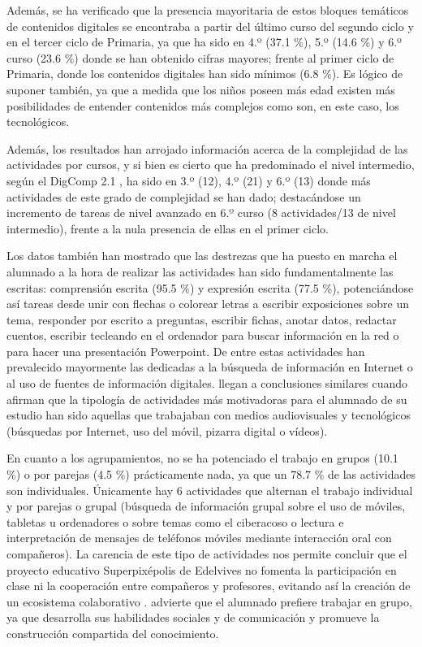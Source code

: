 \documentclass[spanish]{textolivre}
\begin{document}
Además, se ha verificado que la presencia mayoritaria de estos bloques temáticos de contenidos digitales se encontraba a partir del último curso del segundo ciclo y en el tercer ciclo de Primaria, ya que ha sido en 4.º (37.1 \%), 5.º (14.6 \%) y 6.º curso (23.6 \%) donde se han obtenido cifras mayores; frente al primer ciclo de Primaria, donde los contenidos digitales han sido mínimos (6.8 \%). Es lógico de suponer también, ya que a medida que los niños poseen más edad existen más posibilidades de entender contenidos más complejos como son, en este caso, los tecnológicos. 

Además, los resultados han arrojado información acerca de la complejidad de las actividades por cursos, y si bien es cierto que ha predominado el nivel intermedio, según el DigComp 2.1 \cite{carretero_2018}, ha sido en 3.º (12), 4.º (21) y 6.º (13) donde más actividades de este grado de complejidad se han dado; destacándose un incremento de tareas de nivel avanzado en 6.º curso (8 actividades/13 de nivel intermedio), frente a la nula presencia de ellas en el primer ciclo. 

Los datos también han mostrado que las destrezas que ha puesto en marcha el alumnado a la hora de realizar las actividades han sido fundamentalmente las escritas: comprensión escrita (95.5 \%) y expresión escrita (77.5 \%), potenciándose así tareas desde unir con flechas o colorear letras a escribir exposiciones sobre un tema, responder por escrito a preguntas, escribir fichas, anotar datos, redactar cuentos, escribir tecleando en el ordenador para buscar información en la red o para hacer una presentación Powerpoint. De entre estas actividades han prevalecido mayormente las dedicadas a la búsqueda de información en Internet o al uso de fuentes de información digitales. \textcite{calcines_pinero_integracion_2016} llegan a conclusiones similares cuando afirman que la tipología de actividades más motivadoras para el alumnado de su estudio han sido aquellas que trabajaban con medios audiovisuales y tecnológicos (búsquedas por Internet, uso del móvil, pizarra digital o vídeos). 

En cuanto a los agrupamientos, no se ha potenciado el trabajo en grupos (10.1 \%) o por parejas (4.5 \%) prácticamente nada, ya que un 78.7 \% de las actividades son individuales. Únicamente hay 6 actividades que alternan el trabajo individual y por parejas o grupal (búsqueda de información grupal sobre el uso de móviles, tabletas u ordenadores o sobre temas como el ciberacoso o lectura e interpretación de mensajes de teléfonos móviles mediante interacción oral con compañeros). La carencia de este tipo de actividades nos permite concluir que el proyecto educativo Superpixépolis de Edelvives no fomenta la participación en clase ni la cooperación entre compañeros y profesores, evitando así la creación de un ecosistema colaborativo \cite{marin_diaz_universidad_2012}. \textcite{diaz_lazaro_social_2016} advierte que el alumnado prefiere trabajar en grupo, ya que desarrolla sus habilidades sociales y de comunicación y promueve la construcción compartida del conocimiento.  
\end{document}
